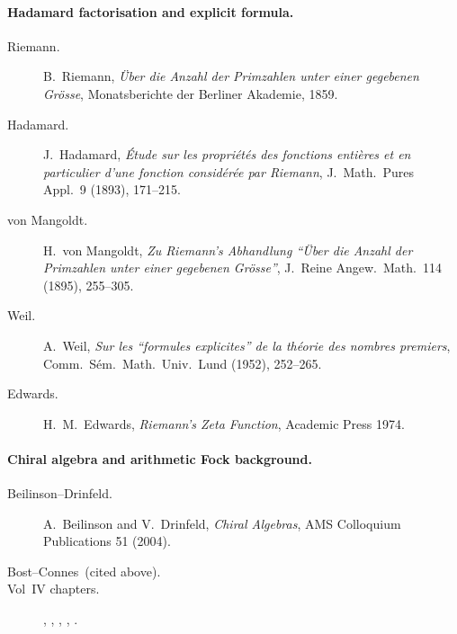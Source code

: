 \paragraph{Hadamard factorisation and explicit formula.}
\begin{description}
\item[Riemann.] B.~Riemann, \emph{\"Uber die Anzahl der Primzahlen
unter einer gegebenen Gr\"osse}, Monatsberichte der Berliner
Akademie, 1859.
\item[Hadamard.] J.~Hadamard, \emph{\'Etude sur les propri\'et\'es
des fonctions enti\`eres et en particulier d'une fonction consid\'er\'ee
par Riemann}, J.~Math.~Pures Appl.~9 (1893), 171--215.
\item[von Mangoldt.] H.~von Mangoldt, \emph{Zu Riemann's Abhandlung
``\"Uber die Anzahl der Primzahlen unter einer gegebenen Gr\"osse''},
J.~Reine Angew.~Math.~114 (1895), 255--305.
\item[Weil.] A.~Weil, \emph{Sur les ``formules explicites'' de la
th\'eorie des nombres premiers}, Comm.~S\'em.~Math.~Univ.~Lund (1952),
252--265.
\item[Edwards.] H.~M.~Edwards, \emph{Riemann's Zeta Function},
Academic Press 1974.
\end{description}

\paragraph{Chiral algebra and arithmetic Fock background.}
\begin{description}
\item[Beilinson--Drinfeld.] A.~Beilinson and V.~Drinfeld,
\emph{Chiral Algebras}, AMS Colloquium Publications 51 (2004).
\item[Bost--Connes~(cited above).]
\item[Vol~IV chapters.] ,
, ,
, .
\end{description}
